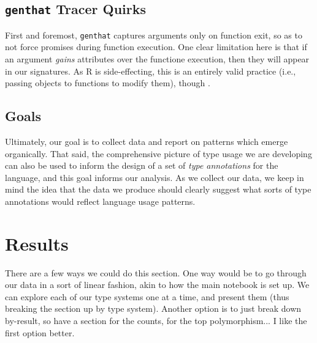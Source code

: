\documentclass[acmsmall,10pt,review,anonymous]{acmart}\settopmatter{printfolios=true,printccs=false,printacmref=false}
\begin{document}



%
%
%
%
\subsection{{\tt genthat} Tracer Quirks}

First and foremost, {\tt genthat} captures arguments only on function exit,
so as to not force promises during function execution.   One
clear limitation here is that if an argument \textit{gains} attributes over
the functione execution, then they will appear in our signatures.  As R is
side-effecting, this is an entirely valid practice (i.e., passing objects to
functions to modify them), though .


%
%
%
%
\subsection{Goals}

Ultimately, our goal is to collect data and report on patterns which emerge
organically.  That said, the comprehensive picture of type usage we are
developing can also be used to inform the design of a set of \textit{type
  annotations} for the language, and this goal informs our analysis.  As we
collect our data, we keep in mind the idea that the data we produce should
clearly suggest what sorts of type annotations would reflect language usage
patterns.

%
%
%
%
%
%
\section{Results}

 There are a few ways we could do this section.
One way would be to go through our data in a sort of linear fashion, akin to how the main notebook is set up.
We can explore each of our type systems one at a time, and present them (thus breaking the section up by type system).
Another option is to just break down by-result, so have a section for the counts, for the top polymorphism...
I like the first option better.
\end{document}
